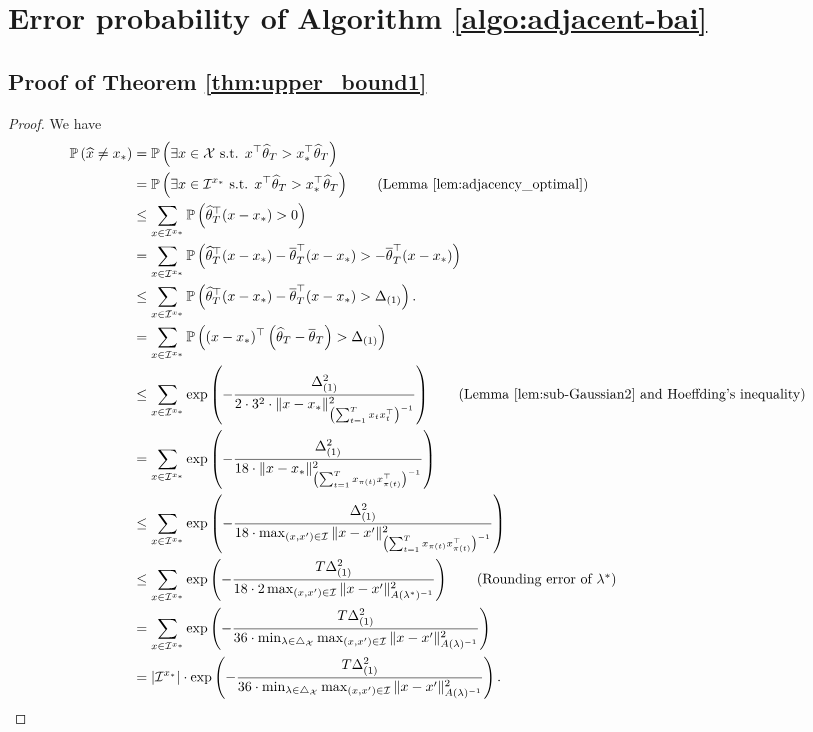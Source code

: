\section{Error probability of Algorithm \ref{algo:adjacent-bai}}\label{appendixupper}
\subsection{Proof of Theorem \ref{thm:upper_bound1}}
\begin{proof}
    We have
    \begin{align*}
        \P\Sp{\widehat{x}\neq x_*}&=\P\Sp{\exists x 
        \in \X  \text{ s.t. }x^\top\htheta_T>x_*^\top\htheta_T}\\
        &= \P\Sp{\exists x\in \I^{x_*}\text{ s.t. }x^\top\htheta_T> x_*^\top\htheta_T}  \tag{Lemma \ref{lem:adjacency_optimal}}\\
        &\leq  \sum_{x \in \I^{x_*} }\P\Sp{\htheta_T^\top(x-x_*)> 0}\\
        &= \sum_{x \in \I^{x_*}}\P\Sp{\htheta_T^\top(x-x_*) - \otheta_T^\top(x-x_*)>-\otheta_T^\top(x-x_*)}\\
        &\leq \sum_{x \in \I^{x_*}}\P\Sp{\htheta_T^\top(x-x_*) - \otheta_T^\top(x-x_*)> \Delta_{(1)}}. \\
        &=  \sum_{x \in \I^{x_*}}\P\Sp{(x-x_*)^\top\left(\htheta_T -\otheta_T\right)> \Delta_{(1)}} \\
        &\leq \sum_{x \in \I^{x_*}}\exp\left(- \frac{\Delta_{(1)}^2}{2\cdot 3^2 \cdot \|x - x_*\|_{\left(\sum_{t=1}^Tx_tx_t^\top\right)^{-1}}^2}\right) \tag{Lemma \ref{lem:sub-Gaussian2} and Hoeffding's inequality}\\
        &= \sum_{x \in \I^{x_*}}\exp\left(- \frac{\Delta_{(1)}^2}{18 \cdot\|x-x_*\|_{\left(\sum_{t=1}^Tx_{\pi(t)}x_{\pi(t)}^\top\right)^{-1}}^2}\right) \\
        &\leq \sum_{x \in \I^{x_*}}\exp\left(- \frac{\Delta_{(1)}^2}{18 \cdot \max_{(x, x') \in \mc{I}}\|x - x'\|_{\left(\sum_{t=1}^Tx_{\pi(t)}x_{\pi(t)}^\top\right)^{-1}}^2}\right) \\
        &\leq \sum_{x \in \I^{x_*}}\exp\left(- \frac{T\Delta_{(1)}^2}{18 \cdot2\max_{(x, x') \in \mc{I}}\|x - x'\|_{A(\lambda^{*})^{-1}}^2}\right) \tag{Rounding error of $\lambda^*$}\\
        &= \sum_{x \in \I^{x_*}}\exp\left(- \frac{T\Delta_{(1)}^2}{36 \cdot \min_{\lambda \in \triangle_{\X}} \max_{(x, x') \in \mc{I}}\|x - x'\|_{A(\lambda)^{-1}}^2}\right) \\
        &= \left|\I^{x_*}\right| \cdot \exp\left(- \frac{T\Delta_{(1)}^2}{36 \cdot \min_{\lambda \in \triangle_{\X}} \max_{(x, x') \in \mc{I}}\|x - x'\|_{A(\lambda)^{-1}}^2}\right).
    \end{align*}
\end{proof}
